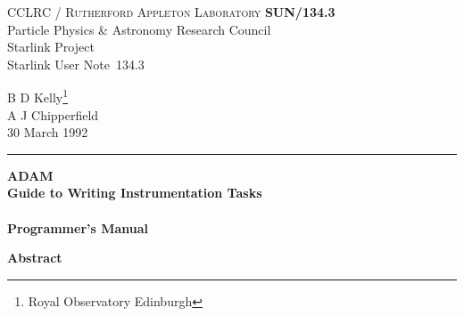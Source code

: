 \documentclass[twoside,11pt]{article}
\newcommand{\stardoccategory}  {Starlink User Note}
\newcommand{\stardocinitials}  {SUN}
\newcommand{\stardocnumber}    {134.3}
\newcommand{\stardocauthors}   {B D Kelly\footnote{Royal Observatory
Edinburgh}\\A J Chipperfield}
\newcommand{\stardocdate}      {30 March 1992}
\newcommand{\stardoctitle}     {ADAM\\[2ex]
                                Guide to Writing Instrumentation Tasks}
\newcommand{\stardocversion}   {}
\newcommand{\stardocmanual}    {Programmer's Manual}
\newcommand{\stardocname}{\stardocinitials /\stardocnumber}
\newenvironment{latexonly}{}{}
\renewcommand{\_}{\texttt{\symbol{95}}}
\begin{document}
\thispagestyle{empty}

\begin{latexonly}
   CCLRC / \textsc{Rutherford Appleton Laboratory} \hfill \textbf{\stardocname}\\
   {\large Particle Physics \& Astronomy Research Council}\\
   {\large Starlink Project\\}
   {\large \stardoccategory\ \stardocnumber}
   \begin{flushright}
   \stardocauthors\\
   \stardocdate
   \end{flushright}
   \vspace{-4mm}
   \rule{\textwidth}{0.5mm}
   \vspace{5mm}
   \begin{center}
   {\Huge\textbf{\stardoctitle \\ [2.5ex]}}
   {\LARGE\textbf{\stardocversion \\ [4ex]}}
   {\Huge\textbf{\stardocmanual}}
   \end{center}
   \vspace{5mm}


   \vspace{10mm}
   \begin{center}
      {\Large\textbf{Abstract}}
   \end{center}
\end{latexonly}
\end{document}
